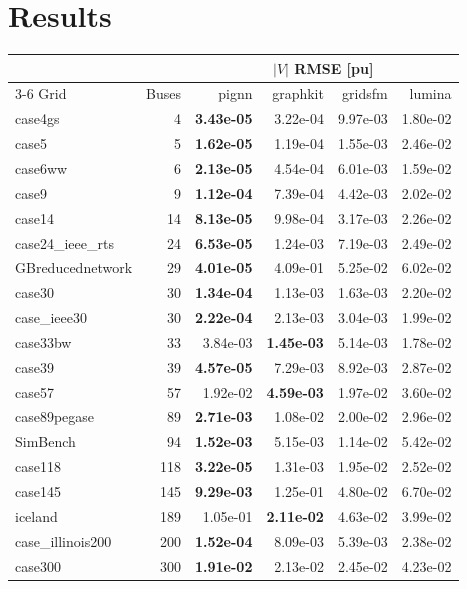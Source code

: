 \documentclass[10pt]{article}
\begin{document}
\section{Results}

\begin{table}[H]
\centering\small
\begin{tabular}{lr rrrr}
\toprule
 & & \multicolumn{4}{c}{$|V|$ RMSE [pu]} \\
\cmidrule(lr){3-6}
Grid & Buses & pignn & graphkit & gridsfm & lumina \\
\midrule
case4gs & 4 & \textbf{3.43e-05} & 3.22e-04 & 9.97e-03 & 1.80e-02 \\
case5 & 5 & \textbf{1.62e-05} & 1.19e-04 & 1.55e-03 & 2.46e-02 \\
case6ww & 6 & \textbf{2.13e-05} & 4.54e-04 & 6.01e-03 & 1.59e-02 \\
case9 & 9 & \textbf{1.12e-04} & 7.39e-04 & 4.42e-03 & 2.02e-02 \\
case14 & 14 & \textbf{8.13e-05} & 9.98e-04 & 3.17e-03 & 2.26e-02 \\
case24\_ieee\_rts & 24 & \textbf{6.53e-05} & 1.24e-03 & 7.19e-03 & 2.49e-02 \\
GBreducednetwork & 29 & \textbf{4.01e-05} & 4.09e-01 & 5.25e-02 & 6.02e-02 \\
case30 & 30 & \textbf{1.34e-04} & 1.13e-03 & 1.63e-03 & 2.20e-02 \\
case\_ieee30 & 30 & \textbf{2.22e-04} & 2.13e-03 & 3.04e-03 & 1.99e-02 \\
case33bw & 33 & 3.84e-03 & \textbf{1.45e-03} & 5.14e-03 & 1.78e-02 \\
case39 & 39 & \textbf{4.57e-05} & 7.29e-03 & 8.92e-03 & 2.87e-02 \\
case57 & 57 & 1.92e-02 & \textbf{4.59e-03} & 1.97e-02 & 3.60e-02 \\
case89pegase & 89 & \textbf{2.71e-03} & 1.08e-02 & 2.00e-02 & 2.96e-02 \\
SimBench & 94 & \textbf{1.52e-03} & 5.15e-03 & 1.14e-02 & 5.42e-02 \\
case118 & 118 & \textbf{3.22e-05} & 1.31e-03 & 1.95e-02 & 2.52e-02 \\
case145 & 145 & \textbf{9.29e-03} & 1.25e-01 & 4.80e-02 & 6.70e-02 \\
iceland & 189 & 1.05e-01 & \textbf{2.11e-02} & 4.63e-02 & 3.99e-02 \\
case\_illinois200 & 200 & \textbf{1.52e-04} & 8.09e-03 & 5.39e-03 & 2.38e-02 \\
case300 & 300 & \textbf{1.91e-02} & 2.13e-02 & 2.45e-02 & 4.23e-02 \\

\end{tabular}
\end{table}
\end{document}
